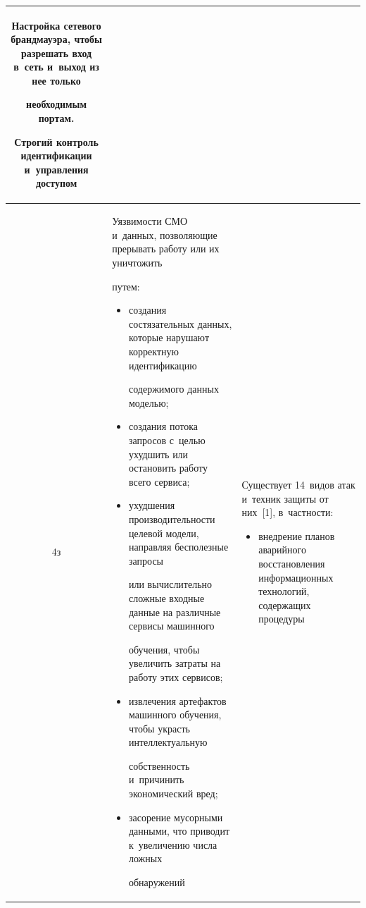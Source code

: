 \begin{table}
\begin{center}
\begin{tabular}{|c|p{58mm}|p{58mm}|}
Настройка сетевого брандмауэра, чтобы разрешать вход в~сеть и~выход из нее только 

необходимым портам.\newline

Строгий контроль идентификации и~управления доступом\\

\hline

4з&Уязвимости СМО и~данных, позволяющие прерывать работу или их уничтожить 

путем:\vspace*{-6pt} 

\begin{itemize}

\addtolength{\itemsep}{-6pt}

\item создания состязательных данных, которые нарушают корректную идентификацию 

содержимого данных моделью;

\item создания потока запросов с~целью ухудшить или остановить работу всего сервиса;

\item ухудшения про\-из\-во\-ди\-тель\-ности целевой модели, направляя бесполезные запросы 

или вычислительно сложные входные данные на различные сервисы машинного 

обучения, чтобы увеличить затраты на работу этих сервисов;

\item извлечения артефактов машинного обучения, чтобы украсть интеллектуальную 

собственность и~причинить экономический вред;

\item засорение мусорными данными, что приводит к~увеличению числа ложных 

обнаружений\vspace*{-6pt}

\end{itemize}&Существует 14~видов атак и~техник защиты от них~[1], в~частности:\vspace*{-6pt}

\begin{itemize}

\addtolength{\itemsep}{-6pt}

\item внедрение планов аварийного восстановления информационных технологий, содержащих процедуры 


\end{itemize}
\end{tabular}
\end{center}
\end{table}
